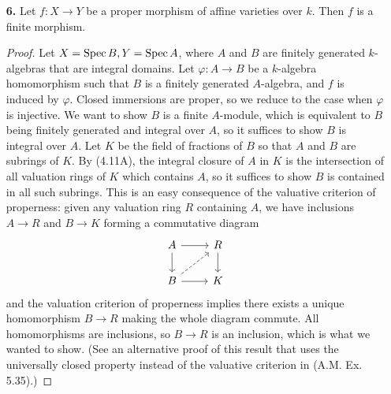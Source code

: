 \documentclass{article}
\begin{document}
\begin{enumerate} [label=\textbf{\arabic*.}, leftmargin=0em]
\begin{proof}
    \begin{itemize} [leftmargin=0cm]
        \item[(a)] Let $k$ be a field, let $X = \spec{k[\varepsilon]/(\varepsilon^2)}$ (Ex. 2.8), and let $Y$ be any scheme over $k$. Giving a $k$-morphism $X \to Y$ is equivalent to giving a point in $y \in Y$ rational over $k$, and an element of $\goth{m}_y / \goth{m}_y^2$.
        \item[(b)] Let $X$ be the affine line, and let $Y$ be the affine line with the origin doubled. We have two possible open immersions of $X$ into $Y$ with each one having either origin in its image, and the open immersions agree on the complement of the origin of $X$, which is an open dense subset of $X$.
    \end{itemize}
\end{proof}

\newpage

\item[\textbf{6.}] Let $f : X \to Y$ be a proper morphism of affine varieties over $k$. Then $f$ is a finite morphism.

\begin{proof}
    Let $X = \operatorname{Spec}{B}, Y = \operatorname{Spec}{A}$, where $A$ and $B$ are finitely generated $k$-algebras that are integral domains. Let $\varphi : A \to B$ be a $k$-algebra homomorphism such that $B$ is a finitely generated $A$-algebra, and $f$ is induced by $\varphi$. Closed immersions are proper, so we reduce to the case when $\varphi$ is injective. We want to show $B$ is a finite $A$-module, which is equivalent to $B$ being finitely generated and integral over $A$, so it suffices to show $B$ is integral over $A$. Let $K$ be the field of fractions of $B$ so that $A$ and $B$ are subrings of $K$. By (4.11A), the integral closure of $A$ in $K$ is the intersection of all valuation rings of $K$ which contains $A$, so it suffices to show $B$ is contained in all such subrings. This is an easy consequence of the valuative criterion of properness: given any valuation ring $R$ containing $A$, we have inclusions $A \to R$ and $B \to K$ forming a commutative diagram
    \[\begin{tikzcd}
        A \arrow[d] \arrow[r]          & R \arrow[d] \\
        B \arrow[r] \arrow[ru, dashed] & K          
        \end{tikzcd} \]
    and the valuation criterion of properness implies there exists a unique homomorphism $B \to R$ making the whole diagram commute. All homomorphisms are inclusions, so $B \to R$ is an inclusion, which is what we wanted to show. (See an alternative proof of this result that uses the universally closed property instead of the valuative criterion in (A.M. Ex. 5.35).)
\end{proof}


\end{enumerate}
\end{document}
